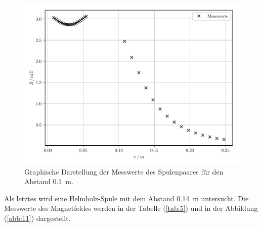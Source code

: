 \begin{figure}[H]
  \includegraphics{plot4.pdf}
  \caption{Graphische Darstellung der Messwerte des Spulenpaares für den Abstand \SI{0.1}{\meter}.}
  \label{abb:10}
\end{figure}

Als letztes wird eine Helmholz-Spule mit dem Abstand \SI{0.14}{\meter} untersucht.
Die Messwerte des Magnetfeldes werden in der Tabelle (\ref{tab:5}) und in der Abbildung
(\ref{abb:11}) dargestellt.

